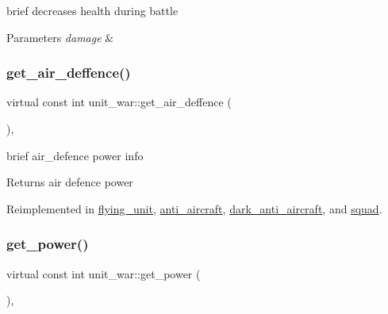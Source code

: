 brief decreases health during battle 
\begin{DoxyParams}{Parameters}
{\em damage} & \\
\hline
\end{DoxyParams}
\mbox{\label{classunit__war_af26f2da420a828230a329339bc9ef805}} 
\subsubsection{\texorpdfstring{get\+\_\+air\+\_\+deffence()}{get\_air\_deffence()}}
{\footnotesize\ttfamily virtual const int unit\+\_\+war\+::get\+\_\+air\+\_\+deffence (\begin{DoxyParamCaption}{ }\end{DoxyParamCaption})\hspace{0.3cm}{\ttfamily [inline]}, {\ttfamily [virtual]}}

brief air\+\_\+defence power info \begin{DoxyReturn}{Returns}
air defence power 
\end{DoxyReturn}


Reimplemented in \mbox{\hyperlink{classflying__unit_a47dbbf3832a5b5e8f5365d87cdbfddab}{flying\+\_\+unit}}, \mbox{\hyperlink{classanti__aircraft_aae33f6c35fe31aaefcf0e0cb73838de1}{anti\+\_\+aircraft}}, \mbox{\hyperlink{classdark__anti__aircraft_a572ddd2093ff6e8479392b788a5be231}{dark\+\_\+anti\+\_\+aircraft}}, and \mbox{\hyperlink{classsquad_ac3655293ec84ecdecd668b6bc0b76ec6}{squad}}.

\mbox{\label{classunit__war_adea1fced490739cf8b7a6e49ec90cf59}} 
\subsubsection{\texorpdfstring{get\+\_\+power()}{get\_power()}}
{\footnotesize\ttfamily virtual const int unit\+\_\+war\+::get\+\_\+power (\begin{DoxyParamCaption}{ }\end{DoxyParamCaption})\hspace{0.3cm}{\ttfamily [inline]}, {\ttfamily [virtual]}}

